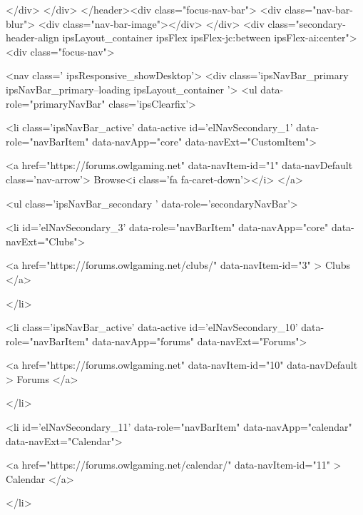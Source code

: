 								</div>
							</div>
						</header><div class="focus-nav-bar">
							<div class="nav-bar-blur">
								<div class="nav-bar-image"></div>
							</div>
							<div class="secondary-header-align ipsLayout_container ipsFlex ipsFlex-jc:between ipsFlex-ai:center">
								<div class="focus-nav">

	<nav  class=' ipsResponsive_showDesktop'>
		<div class='ipsNavBar_primary ipsNavBar_primary--loading ipsLayout_container '>
			<ul data-role="primaryNavBar" class='ipsClearfix'>
				


	
		
		
			
		
		<li class='ipsNavBar_active' data-active id='elNavSecondary_1' data-role="navBarItem" data-navApp="core" data-navExt="CustomItem">
			
			
				<a href="https://forums.owlgaming.net"  data-navItem-id="1" data-navDefault class='nav-arrow'>
					Browse<i class='fa fa-caret-down'></i>
				</a>
			
			
				<ul class='ipsNavBar_secondary ' data-role='secondaryNavBar'>
					


	
		
		
		<li  id='elNavSecondary_3' data-role="navBarItem" data-navApp="core" data-navExt="Clubs">
			
			
				<a href="https://forums.owlgaming.net/clubs/"  data-navItem-id="3"  >
					Clubs
				</a>
			
			
		</li>
	
	

	
		
		
			
		
		<li class='ipsNavBar_active' data-active id='elNavSecondary_10' data-role="navBarItem" data-navApp="forums" data-navExt="Forums">
			
			
				<a href="https://forums.owlgaming.net"  data-navItem-id="10" data-navDefault >
					Forums
				</a>
			
			
		</li>
	
	

	
		
		
		<li  id='elNavSecondary_11' data-role="navBarItem" data-navApp="calendar" data-navExt="Calendar">
			
			
				<a href="https://forums.owlgaming.net/calendar/"  data-navItem-id="11"  >
					Calendar
				</a>
			
			
		</li>
	
	

